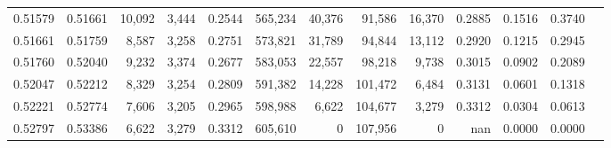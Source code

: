 \begin{tabular}{rrrrrrrrrrrrr}
0.51579 & 0.51661 & 10,092 & 3,444 &                                     0.2544 & 565,234 &  40,376 &  91,586 &  16,370 & 0.2885 & 0.1516 & 0.3740 \\
0.51661 & 0.51759 &  8,587 & 3,258 &                                     0.2751 & 573,821 &  31,789 &  94,844 &  13,112 & 0.2920 & 0.1215 & 0.2945 \\
0.51760 & 0.52040 &  9,232 & 3,374 &                                     0.2677 & 583,053 &  22,557 &  98,218 &   9,738 & 0.3015 & 0.0902 & 0.2089 \\
0.52047 & 0.52212 &  8,329 & 3,254 &                                     0.2809 & 591,382 &  14,228 & 101,472 &   6,484 & 0.3131 & 0.0601 & 0.1318 \\
0.52221 & 0.52774 &  7,606 & 3,205 &                                     0.2965 & 598,988 &   6,622 & 104,677 &   3,279 & 0.3312 & 0.0304 & 0.0613 \\
0.52797 & 0.53386 &  6,622 & 3,279 &                                     0.3312 & 605,610 &       0 & 107,956 &       0 &    nan & 0.0000 & 0.0000 \\
\bottomrule
\end{tabular}
